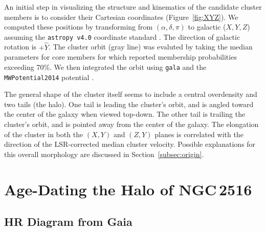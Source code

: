 \documentclass[12pt,twocolumn,tighten]{aastex63}
\begin{document}
An initial step in visualizing the structure and kinematics
of the candidate cluster members is to consider their Cartesian
coordinates (Figure~\ref{fig:XYZ}).  We computed these positions by
transforming from $(\alpha, \delta, \pi)$ to galactic ($X,Y,Z$)
assuming the \texttt{astropy v4.0} coordinate standard
\citep{astropy_2018}.  The direction of galactic rotation is
$+\hat{Y}$. The cluster orbit (gray line) was evaluted by taking the
median parameters for core members for which
 reported membership probabilities
exceeding 70\%.  We then integrated the orbit using \texttt{gala} and
the \texttt{MWPotential2014} potential \citep{bovy_galpy_2015,gala}.

The general shape of the cluster itself seems to include a central
overdensity and two tails (the halo).  One tail is leading the
cluster's orbit, and is angled toward the center of the galaxy when
viewed top-down.  The other tail is trailing the cluster's orbit, and
is pointed away from the center of the galaxy.  The elongation of the
cluster in both the $(X,Y)$ and $(Z,Y)$ planes is correlated with the
direction of the LSR-corrected median cluster velocity.   Possible
explanations for this overall morphology are discussed in
Section~\ref{subsec:origin}.



\section{Age-Dating the Halo of NGC\,2516}
\label{sec:agedate}

\subsection{HR Diagram from Gaia}
\label{subsec:hr}
\end{document}

